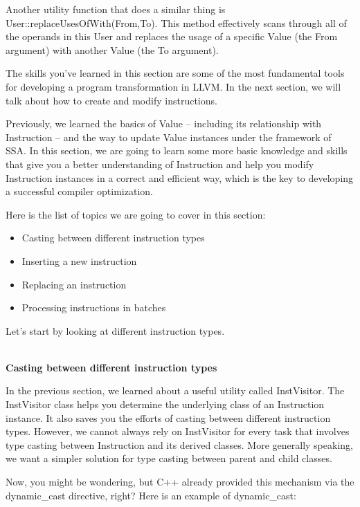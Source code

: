 Another utility function that does a similar thing is User::replaceUsesOfWith(From,To). This method effectively scans through all of the operands in this User and replaces the usage of a specific Value (the From argument) with another Value (the To argument).

The skills you've learned in this section are some of the most fundamental tools for developing a program transformation in LLVM. In the next section, we will talk about how to create and modify instructions.


Previously, we learned the basics of Value – including its relationship with Instruction – and the way to update Value instances under the framework of SSA. In this section, we are going to learn some more basic knowledge and skills that give you a better understanding of Instruction and help you modify Instruction instances in a correct and efficient way, which is the key to developing a successful compiler optimization.

Here is the list of topics we are going to cover in this section:

\begin{itemize}
\item Casting between different instruction types
\item Inserting a new instruction
\item Replacing an instruction
\item Processing instructions in batches
\end{itemize}

Let's start by looking at different instruction types.

\hspace*{\fill} \\ %
\noindent
\textbf{Casting between different instruction types}

In the previous section, we learned about a useful utility called InstVisitor. The InstVisitor class helps you determine the underlying class of an Instruction instance. It also saves you the efforts of casting between different instruction types. However, we cannot always rely on InstVisitor for every task that involves type casting between Instruction and its derived classes. More generally speaking, we want a simpler solution for type casting between parent and child classes.

Now, you might be wondering, but C++ already provided this mechanism via the dynamic\_cast directive, right? Here is an example of dynamic\_cast:

